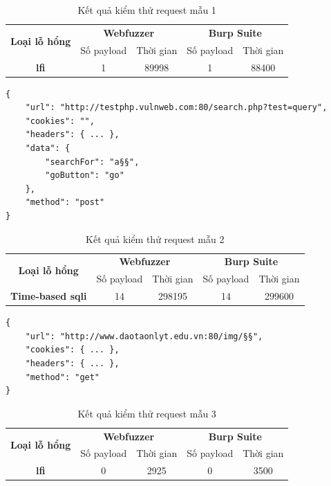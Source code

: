 \FloatBarrier
\begin{table}[ht]
    \centering
    \caption{Kết quả kiểm thử request mẫu 1}
    \label{tab:testing-result-1}
    \begin{tabular}[ht]{ccccc}
        \toprule[1pt]\midrule[0.3pt]
            \multirow{2}{*}{\textbf{Loại lỗ hổng}}&\multicolumn{2}{c}{\textbf{Webfuzzer}}&\multicolumn{2}{c}{\textbf{Burp Suite}}\\
            \cmidrule(lr){2-3}\cmidrule(lr){4-5}{}&Số payload&Thời gian&Số payload&Thời gian\\
        \midrule[0.3pt]
            \textbf{\acrshort{lfi}}&1&89998&1&88400\\
        \midrule[0.3pt]\bottomrule[1pt]
    \end{tabular}
\end{table}
\FloatBarrier
\begin{lstlisting}[style=ES6, label={lst:base-request-2}, caption={Request mẫu 2 có lỗ hổng time-based \acrshort{sqli}}]
{
    "url": "http://testphp.vulnweb.com:80/search.php?test=query",
    "cookies": "",
    "headers": { ... },
    "data": {
        "searchFor": "a§§",
        "goButton": "go"
    },
    "method": "post"
}
\end{lstlisting}
\FloatBarrier
\begin{table}[ht]
    \centering
    \caption{Kết quả kiểm thử request mẫu 2}
    \label{tab:testing-result-2}
    \begin{tabular}[ht]{ccccc}
        \toprule[1pt]\midrule[0.3pt]
            \multirow{2}{*}{\textbf{Loại lỗ hổng}}&\multicolumn{2}{c}{\textbf{Webfuzzer}}&\multicolumn{2}{c}{\textbf{Burp Suite}}\\
            \cmidrule(lr){2-3}\cmidrule(lr){4-5}{}&Số payload&Thời gian&Số payload&Thời gian\\
        \midrule[0.3pt]
            \textbf{Time-based \acrshort{sqli}}&14&298195&14&299600\\
        \midrule[0.3pt]\bottomrule[1pt]
    \end{tabular}
\end{table}
\FloatBarrier
\begin{lstlisting}[style=ES6, label={lst:base-request-3}, caption={Request mẫu 3}]
{
    "url": "http://www.daotaonlyt.edu.vn:80/img/§§",
    "cookies": { ... },
    "headers": { ... },
    "method": "get"
}
\end{lstlisting}
\FloatBarrier
\begin{table}[ht]
    \centering
    \caption{Kết quả kiểm thử request mẫu 3}
    \label{tab:testing-result-3}
    \begin{tabular}[ht]{ccccc}
        \toprule[1pt]\midrule[0.3pt]
            \multirow{2}{*}{\textbf{Loại lỗ hổng}}&\multicolumn{2}{c}{\textbf{Webfuzzer}}&\multicolumn{2}{c}{\textbf{Burp Suite}}\\
            \cmidrule(lr){2-3}\cmidrule(lr){4-5}{}&Số payload&Thời gian&Số payload&Thời gian\\
        \midrule[0.3pt]
            \textbf{\acrshort{lfi}}&0&2925&0&3500\\
        \midrule[0.3pt]\bottomrule[1pt]
    \end{tabular}
\end{table}
